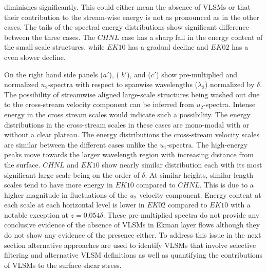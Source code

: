 \documentclass{amsart}
\begin{document}
diminishes significantly. This could either mean the absence of VLSMs or that their contribution to the stream-wise energy is not as pronounced as in the other cases. The tails of the spectral energy distributions show significant difference between the three cases. The $CHNL$ case has a sharp fall in the energy content of the small scale structures, while $EK10$ has  a gradual decline and $EK02$ has a even slower decline. 

On the right hand side panels  ($a'$), ( $b'$), and ($c'$) show pre-multiplied and normalized $u_2$-spectra with respect to spanwise wavelengths ($\lambda_2$) normalized by $\delta$. The possibility  of streamwise aligned large-scale structures  being washed out due to the cross-stream velocity component can be inferred from $u_2$-spectra. Intense energy in the cross stream scales would indicate such a possibility. The energy  distributions in the cross-stream scales in these cases are mono-modal with or without a clear plateau. The energy distributions the cross-stream velocity scales are similar between the different cases unlike the $u_1$-spectra. The high-energy peaks move towards the larger wavelength region with increasing distance from the surface. $CHNL$ and $EK10$  show nearly similar distribution each with its most significant large scale being on the order of $\delta$. At similar heights,  similar length scales tend to have more energy in $EK10$ compared to $CHNL$. This is due to a higher magnitude in fluctuations of the $u_2$ velocity component. Energy content at each scale at each horizontal level is lower in $EK02$ compared to $EK10$ with a notable exception at $z= 0.054\delta$. These pre-multiplied spectra do not provide any conclusive evidence of the absence of VLSMs in Ekman layer  flows although they do not show any evidence of the presence either.  To address this issue in the next section alternative approaches are used to identify VLSMs that involve selective filtering and alternative VLSM definitions as well as quantifying the contributions of VLSMs to the surface shear stress.


\noindent  
\end{document}
